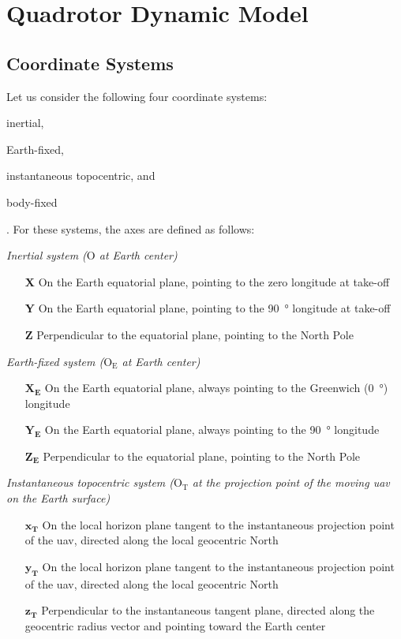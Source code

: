 \chapter{Quadrotor Dynamic Model}

\section{Coordinate Systems}

Let us consider the following four coordinate systems: \begin{enumerate*}[label=(\roman*), noitemsep]
	\item inertial,
	\item Earth-fixed,
	\item instantaneous topocentric, and
	\item body-fixed
\end{enumerate*} \citep[pp.~3\textit{f.}]{Singh1975}. For these systems, the axes are defined as follows:

\textit{Inertial system ($\text{O}$ at Earth center)}

\begin{itemize}[noitemsep]
	\item[\textbf{X}] On the Earth equatorial plane, pointing to the zero longitude at take-off
	\item[\textbf{Y}] On the Earth equatorial plane, pointing to the \SI{90}{\degree} longitude at take-off
	\item[\textbf{Z}] Perpendicular to the equatorial plane, pointing to the North Pole
\end{itemize}

\textit{Earth-fixed system ($\text{O}_\text{E}$ at Earth center)}

\begin{itemize}[noitemsep]
	\item[$\mathbf{X_E}$] On the Earth equatorial plane, always pointing to the Greenwich (\SI{0}{\degree}) longitude
	\item[$\mathbf{Y_E}$] On the Earth equatorial plane, always pointing to the \SI{90}{\degree} longitude
	\item[$\mathbf{Z_E}$] Perpendicular to the equatorial plane, pointing to the North Pole
\end{itemize}

\textit{Instantaneous topocentric system ($\text{O}_\text{T}$ at the projection point of the moving \gls{uav} on the Earth surface)}

\begin{itemize}[noitemsep]
	\item[$\mathbf{x_T}$] On the local horizon plane tangent to the instantaneous projection point of the \gls{uav}, directed along the local geocentric North
	\item[$\mathbf{y_T}$] On the local horizon plane tangent to the instantaneous projection point of the \gls{uav}, directed along the local geocentric North
	\item[$\mathbf{z_T}$] Perpendicular to the instantaneous tangent plane, directed along the geocentric radius vector and pointing toward the Earth center
\end{itemize}

